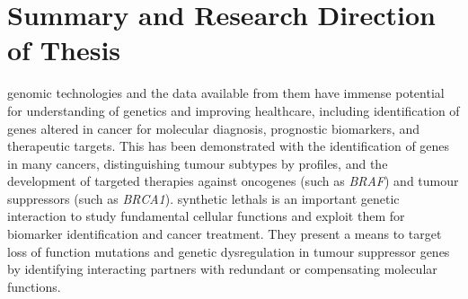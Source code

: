 





\section{Summary and Research Direction of Thesis}

\Gls{genomic} technologies and the data available from them have immense potential for understanding of genetics and improving healthcare, including identification of genes altered in cancer for molecular diagnosis, prognostic biomarkers, and therapeutic targets. This has been demonstrated with the identification of  genes in many cancers, distinguishing tumour subtypes by  profiles, and the development of targeted therapies against \glspl{oncogene} (such as \textit{BRAF}) and \glspl{tumour suppressor} (such as \textit{BRCA1}). \Glspl{synthetic lethal} is an important genetic interaction to study fundamental cellular functions and exploit them for biomarker identification and cancer treatment. They present a means to target loss of function \glspl{mutation} and genetic dysregulation in \gls{tumour suppressor} genes by identifying interacting partners with redundant or compensating molecular functions.  

